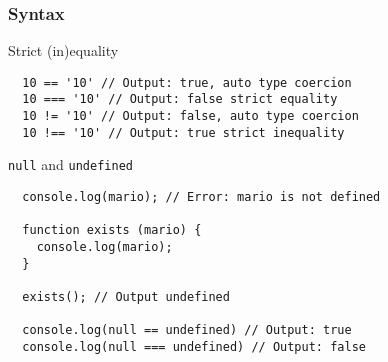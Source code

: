 \begin{frame}[fragile]
  \frametitle{Syntax}

  \begin{block}{Strict (in)equality}
  {\scriptsize
  \begin{verbatim}
  10 == '10' // Output: true, auto type coercion
  10 === '10' // Output: false strict equality
  10 != '10' // Output: false, auto type coercion
  10 !== '10' // Output: true strict inequality
  \end{verbatim}
  }
  \end{block}

  \pause

  \begin{block}{\texttt{null} and \texttt{undefined}}
  {\scriptsize
  \begin{verbatim}
  console.log(mario); // Error: mario is not defined

  function exists (mario) {
    console.log(mario);
  }

  exists(); // Output undefined

  console.log(null == undefined) // Output: true 
  console.log(null === undefined) // Output: false 
  \end{verbatim}
  }
  \end{block}
\end{frame}
